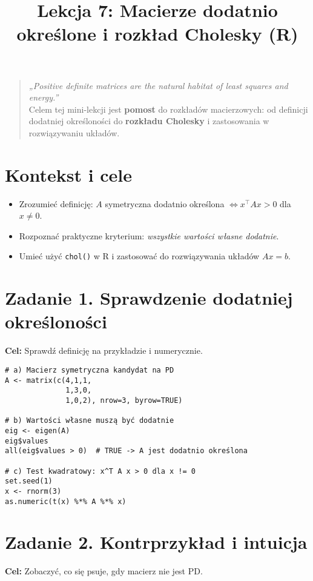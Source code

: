 \documentclass[12pt]{article}
\title{Lekcja 7: Macierze dodatnio określone i rozkład Cholesky (R)}
\author{}
\date{}
\begin{document}
\maketitle

\begin{quote}
\emph{„Positive definite matrices are the natural habitat of least squares and energy.”}\\
Celem tej mini-lekcji jest \textbf{pomost} do rozkładów macierzowych: od definicji dodatniej określoności
do \textbf{rozkładu Cholesky} i zastosowania w rozwiązywaniu układów.
\end{quote}

\section*{Kontekst i cele}
\begin{itemize}
  \item Zrozumieć definicję: $A$ symetryczna dodatnio określona $\iff x^\top A x > 0$ dla $x\neq 0$.
  \item Rozpoznać praktyczne kryterium: \emph{wszystkie wartości własne dodatnie}.
  \item Umieć użyć \texttt{chol()} w R i zastosować do rozwiązywania układów $Ax=b$.
\end{itemize}

\section*{Zadanie 1. Sprawdzenie dodatniej określoności}
\textbf{Cel:} Sprawdź definicję na przykładzie i numerycznie.

\begin{lstlisting}
# a) Macierz symetryczna kandydat na PD
A <- matrix(c(4,1,1,
              1,3,0,
              1,0,2), nrow=3, byrow=TRUE)

# b) Wartości własne muszą być dodatnie
eig <- eigen(A)
eig$values
all(eig$values > 0)  # TRUE -> A jest dodatnio określona

# c) Test kwadratowy: x^T A x > 0 dla x != 0
set.seed(1)
x <- rnorm(3)
as.numeric(t(x) %*% A %*% x)
\end{lstlisting}

\section*{Zadanie 2. Kontrprzykład i intuicja}
\textbf{Cel:} Zobaczyć, co się psuje, gdy macierz nie jest PD.
\end{document}
